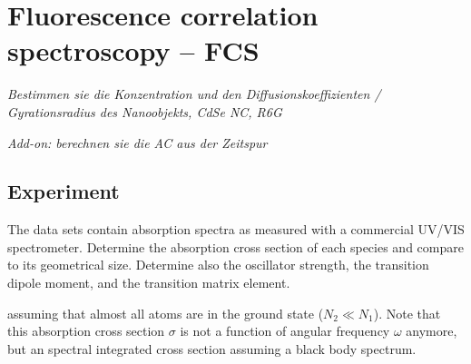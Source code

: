 

\chapter{Fluorescence correlation spectroscopy -- FCS}


\textit{Bestimmen sie die Konzentration und den Diffusionskoeffizienten / Gyrationsradius des Nanoobjekts, CdSe NC, R6G}


\textit{Add-on: berechnen sie die AC aus der Zeitspur}


\section{Experiment}

The data sets contain absorption spectra as measured with a commercial UV/VIS spectrometer. Determine the absorption cross section of each species and compare to its geometrical size. Determine also the oscillator strength, the transition dipole moment, and the transition matrix element.

assuming that almost all atoms are in the ground state ($N_2 \ll N_1$). Note that this absorption cross section $\sigma$ is not a function of angular frequency $\omega$ anymore, but an spectral integrated cross section assuming a black body spectrum.





\printbibliography[segment=\therefsegment,heading=subbibliography]
